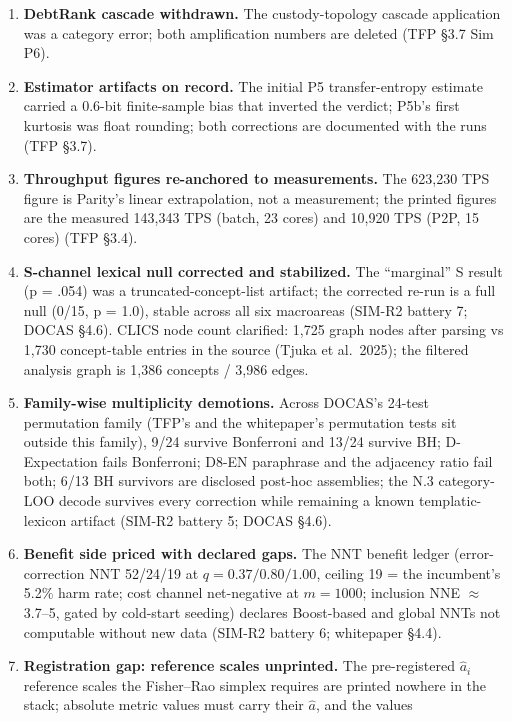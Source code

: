 \documentclass[11pt]{article}
\begin{document}
\begin{enumerate}
unattested; the real Sybil defense is the attestation multiplier plus the
wall-clock time floor (TFP \S{}3.7 Sim P8; whitepaper \S{}1.4).
\item \textbf{DebtRank cascade withdrawn.} The custody-topology cascade application
was a category error; both amplification numbers are deleted (TFP \S{}3.7 Sim P6).
\item \textbf{Estimator artifacts on record.} The initial P5 transfer-entropy
estimate carried a 0.6-bit finite-sample bias that inverted the verdict; P5b's
first kurtosis was float rounding; both corrections are documented with the runs
(TFP \S{}3.7).
\item \textbf{Throughput figures re-anchored to measurements.} The 623,230 TPS
figure is Parity's linear extrapolation, not a measurement; the printed figures are
the measured 143,343 TPS (batch, 23 cores) and 10,920 TPS (P2P, 15 cores)
(TFP \S{}3.4).
\item \textbf{S-channel lexical null corrected and stabilized.} The ``marginal'' S
result (p = .054) was a truncated-concept-list artifact; the corrected re-run is a
full null (0/15, p = 1.0), stable across all six macroareas (SIM-R2 battery 7;
DOCAS \S{}4.6). CLICS node count clarified: 1,725 graph nodes after parsing
vs 1,730 concept-table entries in the source (Tjuka et al.\ 2025); the filtered
analysis graph is 1,386 concepts / 3,986 edges.
\item \textbf{Family-wise multiplicity demotions.} Across DOCAS's 24-test
permutation family (TFP's and the whitepaper's permutation tests sit outside
this family), 9/24 survive Bonferroni and 13/24 survive BH; D-Expectation
fails Bonferroni; D8-EN paraphrase and the adjacency ratio fail both; 6/13 BH
survivors are disclosed post-hoc assemblies; the N.3 category-LOO decode survives
every correction while remaining a known templatic-lexicon artifact (SIM-R2
battery 5; DOCAS \S{}4.6).
\item \textbf{Benefit side priced with declared gaps.} The NNT benefit ledger
(error-correction NNT 52/24/19 at $q = 0.37/0.80/1.00$, ceiling 19 = the
incumbent's 5.2\% harm rate; cost channel net-negative at $m = 1000$; inclusion
NNE $\approx$ 3.7--5, gated by cold-start seeding) declares Boost-based and global
NNTs not computable without new data (SIM-R2 battery 6; whitepaper \S{}4.4).
\item \textbf{Registration gap: reference scales unprinted.} The pre-registered
$\hat{a}_i$ reference scales the Fisher--Rao simplex requires are printed nowhere
in the stack; absolute metric values must carry their $\hat{a}$, and the values

\end{enumerate}
\end{document}
